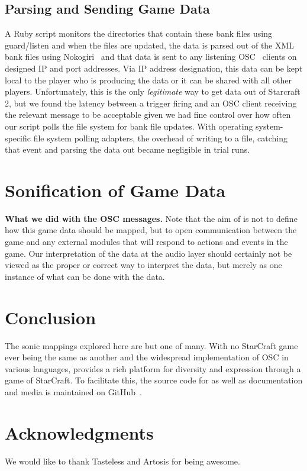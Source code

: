 \documentclass{nime-document-class}
\begin{document}
\subsection{Parsing and Sending Game Data}
A Ruby script monitors the directories that contain these bank files using guard/listen and when the files are updated, the data is parsed out of the XML bank files using Nokogiri~\cite{Nokogiri:Online} and that data is sent to any listening OSC~\cite{OSC:Online} clients on designed IP and port addresses. Via IP address designation, this data can be kept local to the player who is producing the data or it can be shared with all other players. 
Unfortunately, this is the only {\em legitimate} way to get data out of Starcraft 2, but we found the latency between a trigger firing and an OSC client receiving the relevant message to be acceptable given we had fine control over how often our script polls the file system for bank file updates.
With operating system-specific file system polling adapters, the overhead of writing to a file, catching that event and parsing the data out became negligible in trial runs.

\section{Sonification of Game Data}
{\bf What we did with the OSC messages.}
Note that the aim of \projectName{} is not to define how this game data should be mapped, but to open communication between the game and any external modules that will respond to actions and events in the game.
Our interpretation of the data at the audio layer should certainly not be viewed as the proper or correct way to interpret the data, but merely as one instance of what can be done with the data.  

\section{Conclusion}
The sonic mappings explored here are but one of many.
With no StarCraft game ever being the same as another and the widespread implementation of OSC in various languages, \projectName{} provides a rich platform for diversity and expression through a game of StarCraft.
To facilitate this, the source code for \projectName{} as well as documentation and media is maintained on GitHub~\cite{LOrkCraft:Online}. 

\section{Acknowledgments}
We would like to thank Tasteless and Artosis for being awesome.


{}

\end{document}
